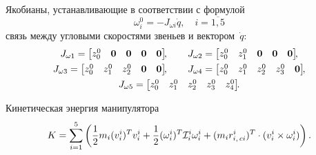Якобианы, устанавливающие в соответствии с формулой
\begin{equation}\label{eq_work_of_ang_jacobians}
    \omega^0_{i} = -J_{\omega i}\dot{q}, \quad i = \overline{1,5}
\end{equation}
связь между угловыми скоростями звеньев и вектором~$\dot{q}$:
\begin{gather}
    J_{\omega 1} =
    \begin{bmatrix}
        z^0_0 & \nv & \nv & \nv & \nv
    \end{bmatrix}\!\!,
    \qquad
    J_{\omega 2} =
    \begin{bmatrix}
        z^0_0 & z^0_1 & \nv & \nv & \nv
    \end{bmatrix}\!\!,
    \\
    J_{\omega 3} =
    \begin{bmatrix}
         z^0_0 & z^0_1 & z^0_2 & \nv & \nv
    \end{bmatrix}\!\!,
    \qquad
    J_{\omega 4} =
    \begin{bmatrix}
        z^0_0 & z^0_1 & z^0_2 & z^0_3 & \nv
    \end{bmatrix}\!\!,
    \\
    J_{\omega 5} =
    \begin{bmatrix}
        z^0_0 & z^0_1 & z^0_2 & z^0_3 & z^0_4
    \end{bmatrix}\!\!\ldotp
\end{gather}

Кинетическая энергия манипулятора
\begin{equation}\label{eq_eq_for_K_for_linear_model}
    K = \sum_{i=1}^5 \left( \frac{1}{2} m_i (v^i_i)^T v^i_i + \frac{1}{2} (\omega^i_i)^T \mathcal{I}^{i}_i \omega^i_i + (m_ir^i_{i,\,ci})^T \cdot (v^i_i \times \omega^i_i) \right)  \ldotp
\end{equation}

